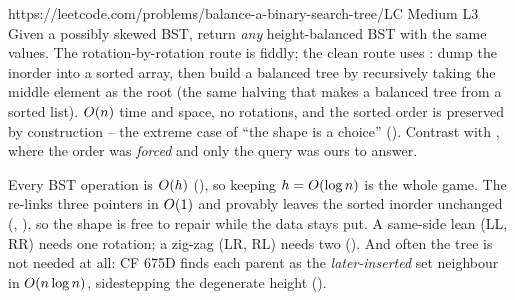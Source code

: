 \begin{practiceset}
    {https://leetcode.com/problems/balance-a-binary-search-tree/}{LC Medium L3}
    {Given a possibly skewed BST, return \emph{any} height-balanced BST with the same values.
    The rotation-by-rotation route is fiddly; the clean route uses : dump the
    inorder into a sorted array, then build a balanced tree by recursively taking the middle element
    as the root (the same halving that makes a balanced tree from a sorted list). $O(n)$ time and
    space, no rotations, and the sorted order is preserved by construction -- the extreme case of
    ``the shape is a choice'' (). Contrast with , where the
    order was \emph{forced} and only the query was ours to answer.}
\end{practiceset}

\begin{recallbox}
Every BST operation is $O(h)$ (), so keeping $h=O(\log n)$ is the
whole game. The  re-links three pointers in $O(1)$ and provably leaves the sorted
inorder unchanged (, ), so the shape is free to repair while
the data stays put. A same-side lean (LL, RR) needs one rotation; a zig-zag (LR, RL) needs two
(). And often the tree is not needed at all: CF 675D finds each parent as the
\emph{later-inserted} set neighbour in $O(n\log n)$, sidestepping the degenerate height
().
\end{recallbox}

